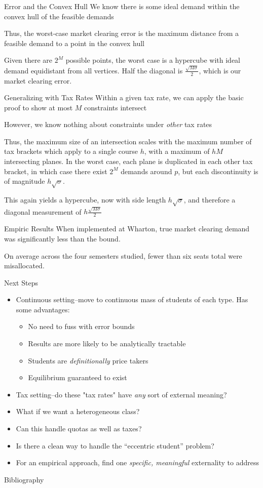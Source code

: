 \documentclass{beamer}
\begin{document}
\begin{frame}{Error and the Convex Hull}
We know there is some ideal demand within the convex hull of the feasible demands

Thus, the worst-case market clearing error is the maximum distance from a feasible demand to a point in the convex hull

Given there are $2^M$ possible points, the worst case is a hypercube with ideal demand equidistant from all vertices. Half the diagonal is $\frac{\sqrt{M\sigma}}{2}$, which is our market clearing error.
\end{frame}

\begin{frame}{Generalizing with Tax Rates}
Within a given tax rate, we can apply the basic proof to show at most $M$ constraints intersect
\pause 

However, we know nothing about constraints under \emph{other} tax rates
\pause 

Thus, the maximum size of an intersection scales with the maximum number of tax brackets which apply to a single course $h$, with a maximum of $hM$ intersecting planes. In the worst case, each plane is duplicated in each other tax bracket, in which case there exist $2^M$ demands around $p$, but each discontinuity is of magnitude $h\sqrt{\sigma}$.

This again yields a hypercube, now with side length $h\sqrt{\sigma}$, and therefore a diagonal measurement of $h\frac{\sqrt{M\sigma}}{2}$
\end{frame}
\begin{frame}{Empiric Results}
When implemented at Wharton, true market clearing demand was significantly less than the bound.

On average across the four semesters studied, fewer than six seats total were misallocated.
\end{frame}
\begin{frame}{Next Steps}
	\begin{itemize}
		\item Continuous setting--move to continuous mass of students of each type. Has some advantages:
		\begin{itemize}
			\item No need to fuss with error bounds
			\item Results are more likely to be analytically tractable
			\item Students are \emph{definitionally} price takers
			\item Equilibrium guaranteed to exist
		\end{itemize}
		\pause
		\item Tax setting--do these "tax rates" have \emph{any} sort of external meaning?
		\pause
		\item What if we want a heterogeneous class?
		\pause
		\item Can this handle quotas as well as taxes?
		\pause
		\item Is there a clean way to handle the ``eccentric student'' problem?
		\pause
		\item For an empirical approach, find one \emph{specific, meaningful} externality to address
	\end{itemize}
\end{frame}
\begin{frame}[allowframebreaks]{Bibliography}
\printbibliography
\end{frame}
\end{document}
